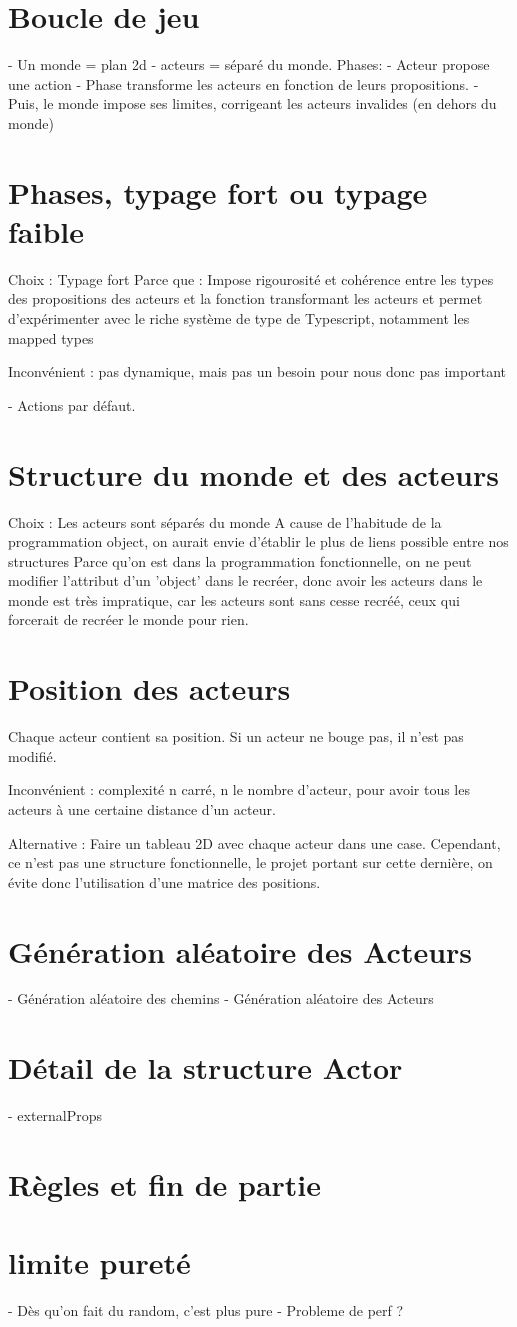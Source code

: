 \documentclass{article}
\begin{document}
\section{Boucle de jeu}
- Un monde = plan 2d
- acteurs = séparé du monde.
Phases:
 - Acteur propose une action
 - Phase transforme les acteurs en fonction de leurs propositions.
 - Puis, le monde impose ses limites, corrigeant les acteurs invalides (en dehors du monde)


\section{Phases, typage fort ou typage faible}
Choix : Typage fort
Parce que : Impose rigourosité et cohérence entre les types des propositions des 
acteurs et la fonction transformant les acteurs et permet d'expérimenter avec 
le riche système de type de Typescript, notamment les mapped types

Inconvénient : pas dynamique, mais pas un besoin pour nous donc pas important

- Actions par défaut.

\section{Structure du monde et des acteurs}
Choix : Les acteurs sont séparés du monde
A cause de l'habitude de la programmation object, on aurait envie d'établir le plus de liens possible entre nos structures
Parce qu'on est dans la programmation fonctionnelle, on ne peut modifier l'attribut d'un 'object' dans le recréer, 
donc avoir les acteurs dans le monde est très impratique, car les acteurs sont sans cesse recréé, ceux qui forcerait de 
recréer le monde pour rien.

\section{Position des acteurs}
Chaque acteur contient sa position.
Si un acteur ne bouge pas, il n'est pas modifié.

Inconvénient : complexité n carré, n le nombre d'acteur, pour avoir tous les acteurs à une certaine distance d'un acteur.

Alternative : Faire un tableau 2D avec chaque acteur dans une case. Cependant, ce n'est pas une structure fonctionnelle, 
le projet portant sur cette dernière, on évite donc l'utilisation d'une matrice des positions.

\section{Génération aléatoire des Acteurs}
- Génération aléatoire des chemins
- Génération aléatoire des Acteurs

\section{Détail de la structure Actor}
- externalProps

\section{Règles et fin de partie}

\section{limite pureté}
- Dès qu'on fait du random, c'est plus pure
- Probleme de perf ?
\end{document}
